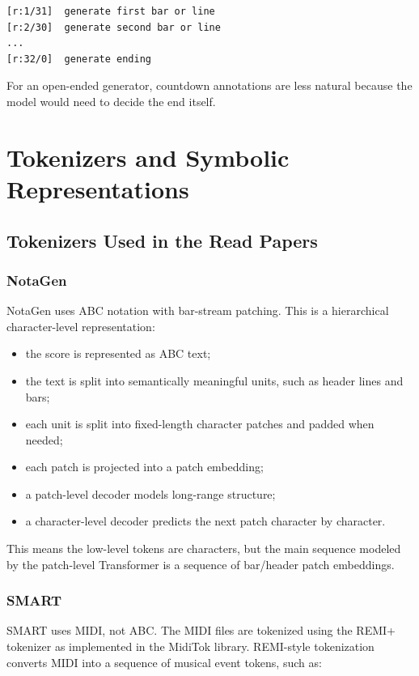 \documentclass[11pt]{article}
\begin{document}
\begin{verbatim}
[r:1/31]  generate first bar or line
[r:2/30]  generate second bar or line
...
[r:32/0]  generate ending
\end{verbatim}

For an open-ended generator, countdown annotations are less natural because the
model would need to decide the end itself.

\section{Tokenizers and Symbolic Representations}
\label{sec:tokenizers}

\subsection{Tokenizers Used in the Read Papers}

\subsubsection{NotaGen}

NotaGen uses ABC notation with bar-stream patching. This is a hierarchical
character-level representation:

\begin{itemize}[leftmargin=*]
  \item the score is represented as ABC text;
  \item the text is split into semantically meaningful units, such as header
  lines and bars;
  \item each unit is split into fixed-length character patches and padded when
  needed;
  \item each patch is projected into a patch embedding;
  \item a patch-level decoder models long-range structure;
  \item a character-level decoder predicts the next patch character by
  character.
\end{itemize}

This means the low-level tokens are characters, but the main sequence modeled by
the patch-level Transformer is a sequence of bar/header patch embeddings.

\subsubsection{SMART}

SMART uses MIDI, not ABC. The MIDI files are tokenized using the REMI+ tokenizer
as implemented in the MidiTok library. REMI-style tokenization converts MIDI into
a sequence of musical event tokens, such as:
\end{document}
